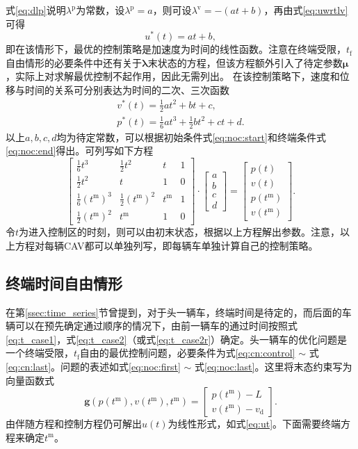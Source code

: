 式\eqref{eq:dlp}说明$\lambda^\mathrm{p}$为常数，设$\lambda^\mathrm{p}=a$，则可设$\lambda^\mathrm{v}=-(at+b)$，再由式\eqref{eq:uwrtlv}可得
\begin{equation}
u^*(t)=at+b,
\label{eq:ut}
\end{equation}
即在该情形下，最优的控制策略是加速度为时间的线性函数。注意在终端受限，$t_\mathrm{f}$自由情形的必要条件中还有关于$\bm{\lambda}$末状态的方程，但该方程额外引入了待定参数$\bm{\mu}$，实际上对求解最优控制不起作用，因此无需列出。
在该控制策略下，速度和位移与时间的关系可分别表达为时间的二次、三次函数
\begin{gather}
v^*(t)=\frac12at^2+bt+c,\\
p^*(t)=\frac16at^3+\frac12bt^2+ct+d.
\end{gather}
以上$a,b,c,d$均为待定常数，可以根据初始条件式\eqref{eq:noc:start}和终端条件式\eqref{eq:noc:end}得出。可列写如下方程
\begin{equation}
\begin{bmatrix}
\frac16t^3 & \frac12t^2 & t & 1 \\
\frac12t^2 & t & 1 & 0 \\
\frac16(t^\mathrm{m})^3 & \frac12(t^\mathrm{m})^2 & t^\mathrm{m} & 1 \\
\frac12(t^\mathrm{m})^2 & t^\mathrm{m} & 1 & 0
\end{bmatrix}\cdot
\begin{bmatrix}
a\\b\\c\\d
\end{bmatrix}
 = \begin{bmatrix}
p(t)\\v(t)\\p(t^\mathrm{m})\\v(t^\mathrm{m})
\end{bmatrix}.
\label{eq:noc:array}
\end{equation}
令$t$为进入控制区的时刻，则可以由初末状态，根据以上方程解出参数。注意，以上方程对每辆CAV都可以单独列写，即每辆车单独计算自己的控制策略。

\subsection{终端时间自由情形}
\label{ssec:freetf}
在第\ref{ssec:time_series}节曾提到，对于头一辆车，终端时间是待定的，而后面的车辆可以在预先确定通过顺序的情况下，由前一辆车的通过时间按照式\eqref{eq:t_case1}，式\eqref{eq:t_case2}（或式\eqref{eq:t_case2r}）确定。头一辆车的优化问题是一个终端受限，$t_\mathrm{f}$自由的最优控制问题，必要条件为式\eqref{eq:cn:control} $\sim$ 式\eqref{eq:cn:last}。问题的表述如式\eqref{eq:noc:first} $\sim$ 式\eqref{eq:noc:last}。这里将末态约束写为向量函数式
\begin{equation}
\bm{g}(p(t^\mathrm{m}),v(t^\mathrm{m}),t^\mathrm{m})=
\begin{bmatrix}
p(t^\mathrm{m})-L\\
v(t^\mathrm{m})-v_\mathrm{d}
\end{bmatrix}.
\end{equation}
由伴随方程和控制方程仍可解出$u(t)$为线性形式，如式\eqref{eq:ut}。下面需要终端方程来确定$t^\mathrm{m}$。

